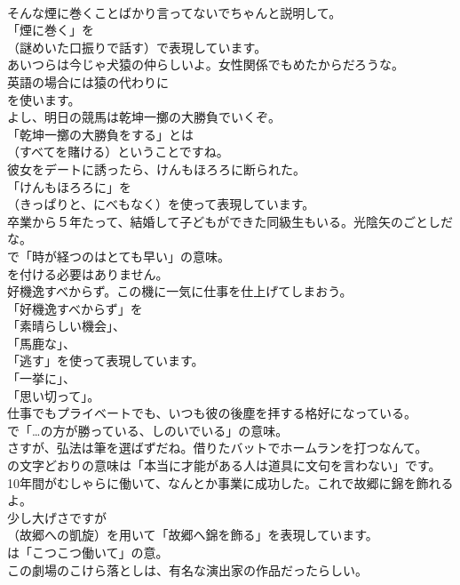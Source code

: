 \documentclass[8pt]{extreport}
\begin{document}
\begin{CJK}{UTF8}{min}
\\	そんな煙に巻くことばかり言ってないでちゃんと説明して。 
\\	「煙に巻く」を 
\\	（謎めいた口振りで話す）で表現しています。	
\\	あいつらは今じゃ犬猿の仲らしいよ。女性関係でもめたからだろうな。 
\\	英語の場合には猿の代わりに
\\	を使います。	
\\	よし、明日の競馬は乾坤一擲の大勝負でいくぞ。 
\\	「乾坤一擲の大勝負をする」とは 
\\	（すべてを賭ける）ということですね。	
\\	彼女をデートに誘ったら、けんもほろろに断られた。 
\\	「けんもほろろに」を 
\\	（きっぱりと、にべもなく）を使って表現しています。	
\\	卒業から５年たって、結婚して子どもができた同級生もいる。光陰矢のごとしだな。 
\\	で「時が経つのはとても早い」の意味。
\\	を付ける必要はありません。	
\\	好機逸すべからず。この機に一気に仕事を仕上げてしまおう。 
\\	「好機逸すべからず」を
\\	「素晴らしい機会」、
\\	「馬鹿な」、
\\	「逃す」を使って表現しています。
\\	「一挙に」、
\\	「思い切って」。	
\\	仕事でもプライベートでも、いつも彼の後塵を拝する格好になっている。 
\\	で「…の方が勝っている、しのいでいる」の意味。	
\\	さすが、弘法は筆を選ばずだね。借りたバットでホームランを打つなんて。 
\\	の文字どおりの意味は「本当に才能がある人は道具に文句を言わない」です。	
\\	10年間がむしゃらに働いて、なんとか事業に成功した。これで故郷に錦を飾れるよ。 
\\	少し大げさですが 
\\	（故郷への凱旋）を用いて「故郷へ錦を飾る」を表現しています。
\\	は「こつこつ働いて」の意。	
\\	この劇場のこけら落としは、有名な演出家の作品だったらしい。 

\end{CJK}
\end{document}
